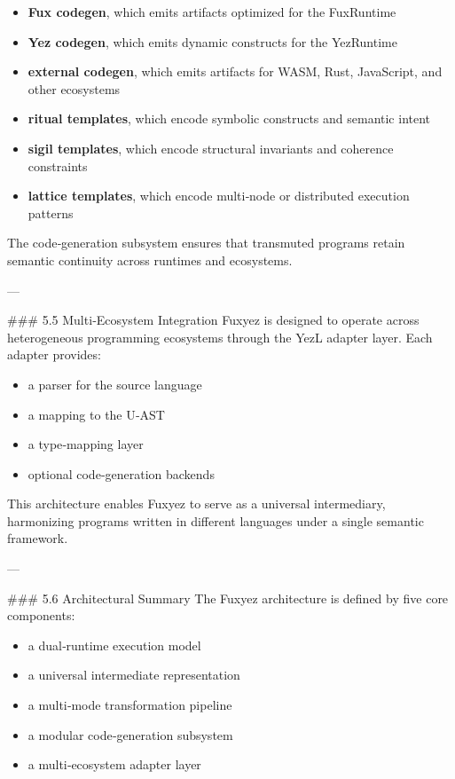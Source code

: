 \documentclass[12pt, a4paper]{book}
\begin{document}
\begin{itemize}
  \item \textbf{Fux codegen}, which emits artifacts optimized for the FuxRuntime  
  \item \textbf{Yez codegen}, which emits dynamic constructs for the YezRuntime  
  \item \textbf{external codegen}, which emits artifacts for WASM, Rust, JavaScript, and other ecosystems  
  \item \textbf{ritual templates}, which encode symbolic constructs and semantic intent  
  \item \textbf{sigil templates}, which encode structural invariants and coherence constraints  
  \item \textbf{lattice templates}, which encode multi‑node or distributed execution patterns  
\end{itemize}

The code‑generation subsystem ensures that transmuted programs retain semantic continuity across runtimes and ecosystems.

---

\#\#\# 5.5 Multi‑Ecosystem Integration  
Fuxyez is designed to operate across heterogeneous programming ecosystems through the YezL adapter layer. Each adapter provides:

\begin{itemize}
  \item a parser for the source language  
  \item a mapping to the U‑AST  
  \item a type‑mapping layer  
  \item optional code‑generation backends  
\end{itemize}

This architecture enables Fuxyez to serve as a universal intermediary, harmonizing programs written in different languages under a single semantic framework.

---

\#\#\# 5.6 Architectural Summary  
The Fuxyez architecture is defined by five core components:

\begin{itemize}
  \item a dual‑runtime execution model  
  \item a universal intermediate representation  
  \item a multi‑mode transformation pipeline  
  \item a modular code‑generation subsystem  
  \item a multi‑ecosystem adapter layer  
\end{itemize}
\end{document}
